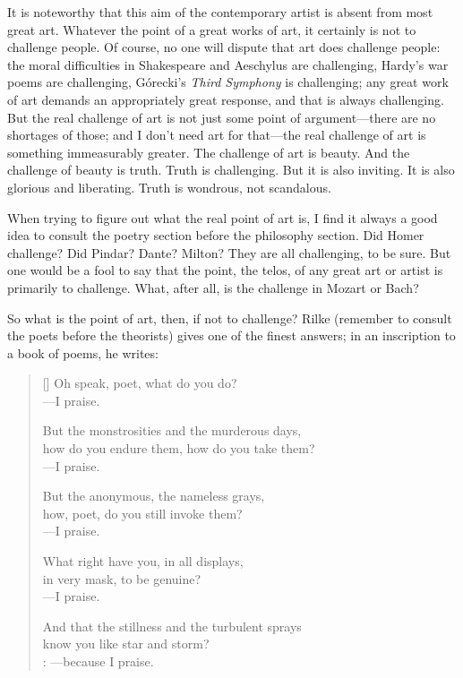 \documentclass[letterpaper]{article}
\begin{document}
It is noteworthy that this aim of the contemporary artist is absent
from most great art. Whatever the point of a great works of art, it
certainly is not to challenge people. Of course, no one will dispute
that art does challenge people: the moral difficulties in Shakespeare
and Aeschylus are challenging, Hardy's war poems are challenging,
Górecki's \emph{Third Symphony} is challenging; any great work of art
demands an appropriately great response, and that is always
challenging. But the real challenge of art is not just some point of
argument---there are no shortages of those; and I don't need art for
that---the real challenge of art is something immeasurably
greater. The challenge of art is beauty. And the challenge of beauty
is truth. Truth is challenging. But it is also inviting. It is also
glorious and liberating. Truth is wondrous, not scandalous.

When trying to figure out what the real point of art is, I find it
always a good idea to consult the poetry section before the philosophy
section. Did Homer challenge? Did Pindar? Dante? Milton? They are all
challenging, to be sure. But one would be a fool to say that the
point, the telos, of any great art or artist is primarily to
challenge. What, after all, is the challenge in Mozart or Bach?

So what is the point of art, then, if not to challenge? Rilke
(remember to consult the poets before the theorists) gives one of the
finest answers; in an inscription to a book of poems, he writes:

\begin{minipage}{\linewidth}
\settowidth{\versewidth}{Oh speak, poet, what do you do?}
\setlength{\vgap}{11em}
\begin{verse}[\versewidth]
Oh speak, poet, what do you do? \\
\vin                    ---I praise.

But the monstrosities and the murderous days, \\
how do you endure them, how do you take them? \\
\vin                    ---I praise.

But the anonymous, the nameless grays, \\
how, poet, do you still invoke them? \\
\vin                    ---I praise.

What right have you, in all displays, \\
in very mask, to be genuine? \\
\vin                    ---I praise.

And that the stillness and the turbulent sprays \\
know you like star and storm? \\
\vin                     : ---because I praise.
\end{verse}
\end{minipage}
\end{document}
